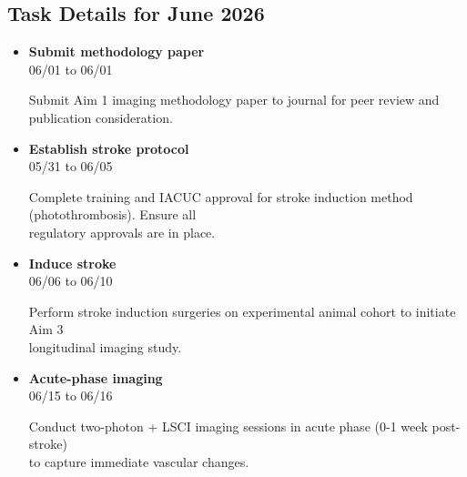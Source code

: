 \documentclass[landscape,a4paper]{article}
\begin{document}
\vspace{0.5cm}
\subsection{Task Details for June 2026}
\begin{itemize}[leftmargin=1cm, itemsep=0.8em]
    \item \textcolor{researchout}{\textbf{Submit methodology paper}}\\[0.2em]
          \textcolor{black!70}{\small 06/01 to 06/01}
\\[0.3em]
          \begin{minipage}[t]{0.85\textwidth}
          \textcolor{black!80}{Submit Aim 1 imaging methodology paper to journal for peer review and\\[0.1em]
          publication consideration.}
          \end{minipage}

    \item \textcolor{other}{\textbf{Establish stroke protocol}}\\[0.2em]
          \textcolor{black!70}{\small 05/31 to 06/05}
\\[0.3em]
          \begin{minipage}[t]{0.85\textwidth}
          \textcolor{black!80}{Complete training and IACUC approval for stroke induction method (photothrombosis). Ensure all\\[0.1em]
          regulatory approvals are in place.}
          \end{minipage}

    \item \textcolor{other}{\textbf{Induce stroke}}\\[0.2em]
          \textcolor{black!70}{\small 06/06 to 06/10}
\\[0.3em]
          \begin{minipage}[t]{0.85\textwidth}
          \textcolor{black!80}{Perform stroke induction surgeries on experimental animal cohort to initiate Aim 3\\[0.1em]
          longitudinal imaging study.}
          \end{minipage}

    \item \textcolor{other}{\textbf{Acute-phase imaging}}\\[0.2em]
          \textcolor{black!70}{\small 06/15 to 06/16}
\\[0.3em]
          \begin{minipage}[t]{0.85\textwidth}
          \textcolor{black!80}{Conduct two-photon + LSCI imaging sessions in acute phase (0-1 week post-stroke)\\[0.1em]
          to capture immediate vascular changes.}
          \end{minipage}


\end{itemize}
\end{document}
